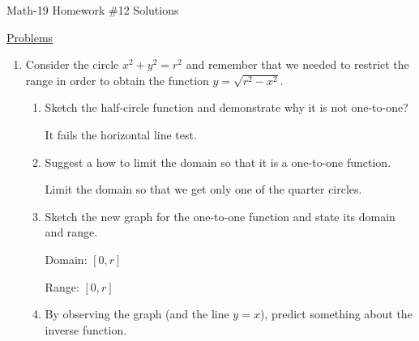 \documentclass[letterpaper,12pt,fleqn]{article}
\begin{document}
\begin{center}
\Large Math-19 Homework \#12 Solutions
\end{center}

\vspace{0.5in}

\underline{Problems}

\begin{enumerate}

\item Consider the circle $x^2+y^2=r^2$ and remember that we needed to restrict
  the range in order to obtain the function $y=\sqrt{r^2-x^2}$.
  \begin{enumerate}
  \item Sketch the half-circle function and demonstrate why it is not
    one-to-one?


    It fails the horizontal line test.
    
  \item Suggest a how to limit the domain so that it is a one-to-one function.

    Limit the domain so that we get only one of the quarter circles.
    
  \item Sketch the new graph for the one-to-one function and state its domain
    and range.


    Domain: $[0,r]$

    Range: $[0,r]$

  \item By observing the graph (and the line $y=x$), predict something about the
    inverse function.



\end{enumerate}
\end{enumerate}
\end{document}
